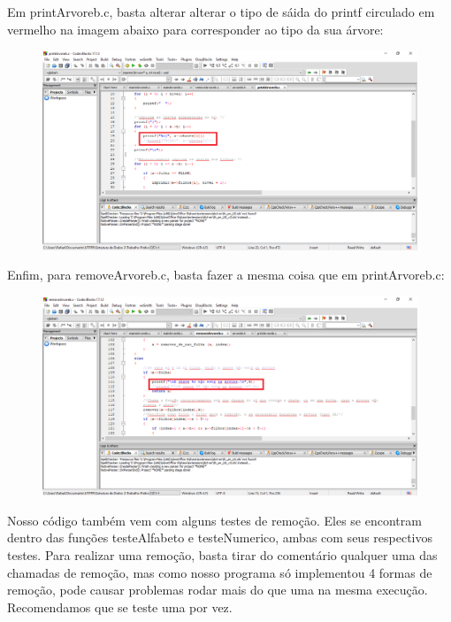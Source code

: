 \par Em printArvoreb.c, basta alterar alterar o tipo de sáida do printf circulado em vermelho na imagem abaixo para corresponder ao tipo da sua árvore:

\begin{figure}[!h]
\centering
\includegraphics[width=6in]{relatorio/imagens/imgMudarTipoPrint.png}
\end{figure}
\newpage
\par Enfim, para removeArvoreb.c, basta fazer a mesma coisa que em printArvoreb.c:

\begin{figure}[!h]
\centering
\includegraphics[width=6in]{relatorio/imagens/imgMudarTipoRemove.png}
\end{figure}
\par Nosso código também vem com alguns testes de remoção. Eles se encontram dentro das funções testeAlfabeto e testeNumerico, ambas com seus respectivos testes. Para realizar uma remoção, basta tirar do comentário qualquer uma das chamadas de remoção, mas como nosso programa só implementou 4 formas de remoção, pode causar problemas rodar mais do que uma na mesma execução. Recomendamos que se teste uma por vez.

